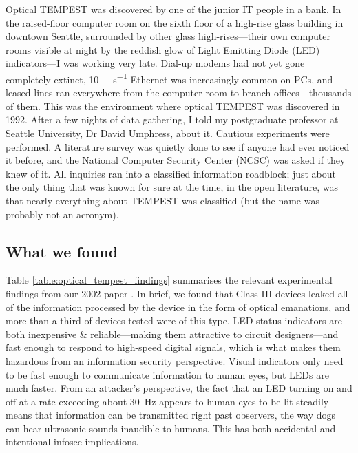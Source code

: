 \documentclass[conference]{IEEEtran}
\begin{document}
Optical TEMPEST was discovered by one of the junior IT people in a bank. In
the raised-floor
computer room on the sixth floor of a high-rise glass building in downtown
Seattle, surrounded by other glass high-rises---their own computer rooms
visible at night by the reddish glow of Light Emitting Diode (LED)
indicators---I was working very late. Dial-up modems had not yet gone
completely extinct, \SI{10}{\mega\bit\per\second} Ethernet was increasingly
common on PCs, and leased lines ran everywhere from the computer room to
branch offices---thousands of them. This was the environment where optical
TEMPEST was discovered in 1992. After a few nights of data gathering, I told
my postgraduate professor at Seattle University, Dr David Umphress, about it.
Cautious experiments were performed. A literature survey was
quietly done to see if anyone had ever noticed it before, and the National
Computer Security Center (NCSC) was asked if they knew of it. All inquiries
ran into a classified information roadblock; just about the only thing that
was known for sure at the time, in the open literature, was that nearly
everything about TEMPEST was classified (but the name was probably not an
acronym).

\subsection{What we found}

Table \ref{table:optical_tempest_findings} summarises the relevant
experimental findings from our 2002 paper \cite{Loughry2002a}. In brief, we
found that Class III devices leaked all of the information processed by the
device in the form of optical emanations, and more than a third of devices
tested were of this type. LED status indicators are both inexpensive \&
reliable---making them attractive to circuit designers---and fast enough to
respond to high-speed digital signals, which is what makes them hazardous
from an information security perspective. Visual indicators only need to be
fast enough to communicate information to human eyes, but LEDs are much
faster. From an attacker's perspective, the fact that an LED turning on and
off at a rate exceeding about \SI{30}{\hertz} appears to human eyes to be lit
steadily means that information can be transmitted right past observers, the
way dogs can hear ultrasonic sounds inaudible to humans. This has both
accidental and intentional infosec implications.
\end{document}
